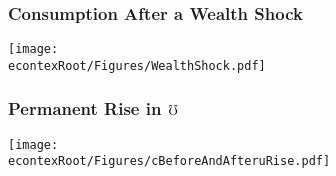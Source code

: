 \documentclass[pdflatex]{beamer}
\begin{document}
{\begin{frame}

                                               \end{frame}

                                               \begin{frame}\frametitle{\textbf{Consumption After a Wealth Shock}}
                                                 \texttt{[image: \\econtexRoot/Figures/WealthShock.pdf]}
                                               \end{frame}

                                               \begin{frame}\frametitle{\textbf{Permanent Rise in $\mho$}}

                                                 \texttt{[image: \\econtexRoot/Figures/cBeforeAndAfteruRise.pdf]}

                                               \end{frame}

                                             }
\end{document}
